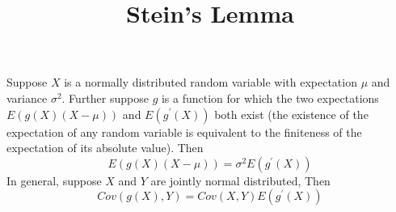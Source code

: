 \documentclass[12pt,a4paper]{article}
\begin{document}
\title{Stein's Lemma}
\maketitle

\paragraph{} Suppose $X$ is a normally distributed random variable with expectation $\mu$ and variance $\sigma^{2}$. Further suppose $g$ is a function for which the two expectations $E(g(X)(X-\mu))$ and $E(g^{'}(X))$ both exist (the existence of the expectation of any random variable is equivalent to the finiteness of the expectation of its absolute value). Then
\begin{equation}
E(g(X)(X-\mu)) = \sigma^{2}E(g^{'}(X))
\end{equation}
In general, suppose $X$ and $Y$ are jointly normal distributed, Then
\begin{equation}
Cov(g(X),Y) = Cov(X,Y)E(g^{'}(X))
\end{equation}



\end{document}
